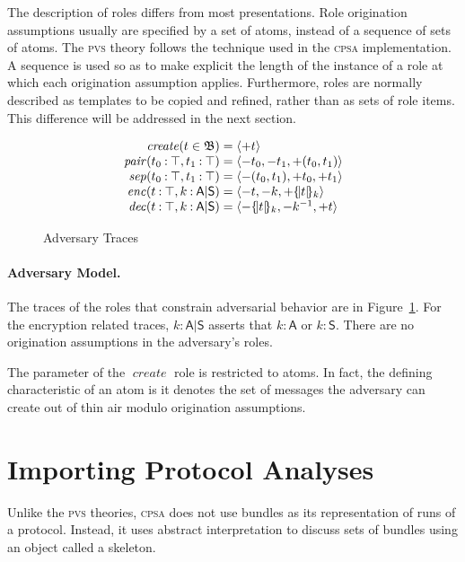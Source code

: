 \documentclass[titlepage,12pt]{article}
\newcommand{\cpsa}{\textsc{cpsa}}
\newcommand{\pvs}{\textsc{pvs}}
\newcommand{\fn}[1]{\ensuremath{\operatorname{\mathit{#1}}}}
\newcommand{\srt}[1]{\ensuremath{\mathsf{#1}}}
\newcommand{\typ}{\mathbin:}
\newcommand{\seq}[1]{\ensuremath{\langle#1\rangle}}
\newcommand{\enc}[2]{\ensuremath{\{\!|#1|\!\}_{#2}}}
\newcommand{\invk}[1]{{#1}^{-1}}
\newcommand{\inbnd}{\mathord -}
\newcommand{\outbnd}{\mathord +}
\newcommand{\alg}[1]{\ensuremath{\mathfrak#1}}
\begin{document}
The description of roles differs from most presentations.  Role
origination assumptions usually are specified by a set of atoms,
instead of a sequence of sets of atoms.  The {\pvs} theory follows the
technique used in the {\cpsa} implementation.  A sequence is used so
as to make explicit the length of the instance of a role at which each
origination assumption applies.  Furthermore, roles are normally
described as templates to be copied and refined, rather than as sets
of role items.  This difference will be addressed in the next section.

\begin{figure}
$$\begin{array}{r@{{}={}}l}
\fn{create}(t\in\alg{B})&\seq{\outbnd t}\\
\fn{pair}(t_0\typ\top, t_1\typ\top)&
\seq{\inbnd t_0,\inbnd t_1,\outbnd (t_0,t_1)}\\
\fn{sep}(t_0\typ\top, t_1\typ\top)&
\seq{\inbnd (t_0, t_1),\outbnd t_0,\outbnd t_1}\\
\fn{enc}(t\typ\top, k\typ\srt{A}|\srt{S})&
\seq{\inbnd t,\inbnd k,\outbnd \enc{t}{k}}\\
\fn{dec}(t\typ\top, k\typ\srt{A}|\srt{S})&
\seq{\inbnd \enc{t}{k},\inbnd\invk{k},\outbnd t}
\end{array}$$
\caption{Adversary Traces}\label{fig:adversary}
\end{figure}

\paragraph{Adversary Model.}
The traces of the roles that constrain adversarial
behavior are in Figure~\ref{fig:adversary}.  For the
encryption related traces, $k\typ\srt{A}|\srt{S}$ asserts that
$k\typ\srt{A}$ or $k\typ\srt{S}$.  There are no origination
assumptions in the adversary's roles.

The parameter of the \fn{create} role is restricted to atoms.  In
fact, the defining characteristic of an atom is it denotes the set of
messages the adversary can create out of thin air modulo origination
assumptions.

\section{Importing Protocol Analyses}\label{sec:sas}

Unlike the {\pvs} theories, {\cpsa} does not use bundles as its
representation of runs of a protocol.  Instead, it uses abstract
interpretation to discuss sets of bundles using an object called a
skeleton.
\end{document}
